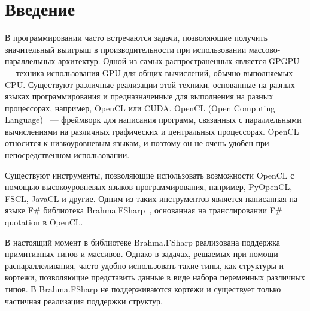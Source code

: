 \documentclass[14pt]{matmex-diploma}
\begin{document}
\maketitle
\tableofcontents
\section*{Введение}
В программировании часто встречаются задачи, позволяющие получить значительный выигрыш в производительности при использовании массово-параллельных архитектур. Одной из самых распространенных является GPGPU — техника использования GPU для общих вычислений, обычно выполняемых CPU. Существуют различные реализации этой техники, основанные на разных языках программирования и предназначенные для выполнения на разных процессорах, например, OpenCL или CUDA. OpenCL (Open Computing Language)~\cite{opencl} — фреймворк для написания программ, связанных с параллельными вычислениями на различных графических и центральных процессорах. OpenCL относится к низкоуровневым языкам, и поэтому он не очень удобен при непосредственном использовании.

Существуют инструменты, позволяющие использовать возможности OpenCL с помощью высокоуровневых языков программирования, например, PyOpenCL, FSCL, JavaCL и другие. Одним из таких инструментов является написанная на языке F\# библиотека Brahma.FSharp~\cite{brahma}, основанная на транслировании F\# quotation в OpenCL.

В настоящий момент в библиотеке Brahma.FSharp реализована поддержка примитивных типов и массивов. Однако в задачах, решаемых при помощи распараллеливания, часто удобно использовать такие типы, как структуры и кортежи, позволяющие представить данные в виде набора переменных различных типов. В Brahma.FSharp не поддерживаются кортежи и существует только частичная реализация поддержки структур.
\end{document}

